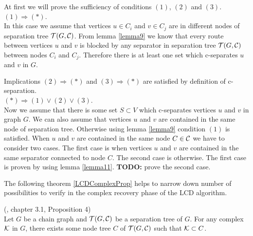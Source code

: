 \begin{prf}
	At first we will prove the sufficiency of conditions $(1)$, $(2)$ and $(3)$. \\ 

	$(1) \Rightarrow (*)$. \\
	In this case we assume that vertices $u \in C_i$ and $v \in C_j$ are in different nodes of separation tree $\mathcal{T}(G, \mathcal{C})$.
	From lemma \ref{lemma9} we know that every route between vertices $u$ and $v$ is blocked by any separator in separation tree
	$\mathcal{T}(G, \mathcal{C})$ between nodes $C_i$ and $C_j$. Therefore there is at least one set which c-separates $u$ and $v$ in $G$.

	Implications $(2) \Rightarrow (*)$ and $(3) \Rightarrow (*)$ are satisfied by definition of c-separation. \\ 

	$(*) \Rightarrow (1) \vee (2) \vee (3) $. \\
	Now we assume that there is some set $S \subset V$ which c-separates vertices $u$ and $v$ in graph $G$.
	We can also assume that vertices $u$ and $v$ are contained in the same node of separation tree. Otherwise
	using lemma \ref{lemma9} condition $(1)$ is satisfied. When $u$ and $v$ are contained in the same node $C \in \mathcal{C}$ we
	have to consider two cases. The first case is when vertices $u$ and $v$ are contained in the same separator connected to 
	node $C$. The second case is otherwise. The first case is proven by using lemma \ref{lemma11}.
	\textbf{TODO:} prove the second case.
	\QED
\end{prf}

 
The following theorem \ref{LCDComplexProp} helps to narrow down number of possibilities to verify 
in the complex recovery phase of the LCD algorithm. 

\begin{thm} \label{LCDComplexProp} (\cite{CG}, chapter 3.1, Proposition 4) \\
	Let $G$ be a chain graph and $\mathcal{T}(G, \mathcal{C})$ be a separation tree of $G$. For any complex $\mathcal{K}$ in $G$, there
	exists some node tree $C$ of $\mathcal{T}(G, \mathcal{C})$ such that $\mathcal{K} \subset C$.
\end{thm}

